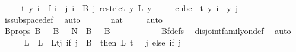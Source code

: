 \begin{isabellebody}
\ \ \ \ {}\ t{\isacharparenright}{\kern0pt}{\isacharparenright}{\kern0pt}\ y\ i\ {\isacharequal}{\kern0pt}\ f\ i{\isacharparenright}{\kern0pt}\ {\isasymand}\ {\isacharparenleft}{\kern0pt}{\isasymforall}j{\isacharless}{\kern0pt}{}{\isachardot}{\kern0pt}\ {\isasymforall}i\ {\isasymin}\ B\ j{\isachardot}{\kern0pt}\ {\isacharparenleft}{\kern0pt}{\isacharparenleft}{\kern0pt}restrict\ {\isacharparenleft}{\kern0pt}{\isasymlambda}y{\isachardot}{\kern0pt}\ L\ {\isacharparenleft}{\kern0pt}y\ {}{\isacharparenright}{\kern0pt}{\isacharparenright}{\kern0pt}\isanewline
\ \ \ \ {\isacharparenleft}{\kern0pt}cube\ {}\ t{\isacharparenright}{\kern0pt}{\isacharparenright}{\kern0pt}\ y{\isacharparenright}{\kern0pt}\ i\ {\isacharequal}{\kern0pt}\ y\ j{\isacharparenright}{\kern0pt}{\isacharparenright}{\kern0pt}{\isachardoublequoteclose}\ \isamarkupfalse%
\ is{\isacharunderscore}{\kern0pt}subspace{\isacharunderscore}{\kern0pt}def\ \isamarkupfalse%
\ auto\ \isanewline
\isanewline
\ \ \ \ \isamarkupfalse%
\ {\isachardoublequoteopen}{\isacharbraceleft}{\kern0pt}{\isachardot}{\kern0pt}{\isachardot}{\kern0pt}{}{\isacharcolon}{\kern0pt}{\isacharcolon}{\kern0pt}nat{\isacharbraceright}{\kern0pt}\ {\isacharequal}{\kern0pt}\ {\isacharbraceleft}{\kern0pt}{}{\isacharcomma}{\kern0pt}\ {}{\isacharbraceright}{\kern0pt}{\isachardoublequoteclose}\ \isamarkupfalse%
\ auto\isanewline
\ \ \ \ \isamarkupfalse%
\ \isamarkupfalse%
\ B{\isacharunderscore}{\kern0pt}props{\isacharcolon}{\kern0pt}\ {\isachardoublequoteopen}B\ {}\ {\isasymunion}\ B\ {}\ {\isacharequal}{\kern0pt}\ {\isacharbraceleft}{\kern0pt}{\isachardot}{\kern0pt}{\isachardot}{\kern0pt}{\isacharless}{\kern0pt}N{\isacharprime}{\kern0pt}{\isacharbraceright}{\kern0pt}\ {\isasymand}\ {\isacharparenleft}{\kern0pt}B\ {}\ {\isasyminter}\ B\ {}\ {\isacharequal}{\kern0pt}\ {\isacharbraceleft}{\kern0pt}{\isacharbraceright}{\kern0pt}{\isacharparenright}{\kern0pt}{\isachardoublequoteclose}\ \isanewline
\ \ \ \ \ \ \isamarkupfalse%
\ Bf{\isacharunderscore}{\kern0pt}defs\ \isamarkupfalse%
\ disjoint{\isacharunderscore}{\kern0pt}family{\isacharunderscore}{\kern0pt}on{\isacharunderscore}{\kern0pt}def\ \isamarkupfalse%
\ auto\isanewline
\ \ \ \ \isamarkupfalse%
\ L{\isacharprime}{\kern0pt}\ \ {\isachardoublequoteopen}L{\isacharprime}{\kern0pt}\ {\isasymequiv}\ L{\isacharparenleft}{\kern0pt}t{\isacharcolon}{\kern0pt}{\isacharequal}{\kern0pt}{\isacharparenleft}{\kern0pt}{\isasymlambda}j{\isachardot}{\kern0pt}\ if\ j\ {\isasymin}\ B\ {}\ then\ L\ {\isacharparenleft}{\kern0pt}t\ {\isacharminus}{\kern0pt}\ {}{\isacharparenright}{\kern0pt}\ j\ else\ {\isacharparenleft}{\kern0pt}if\ j\ {\isasymin}\isanewline

\end{isabellebody}
